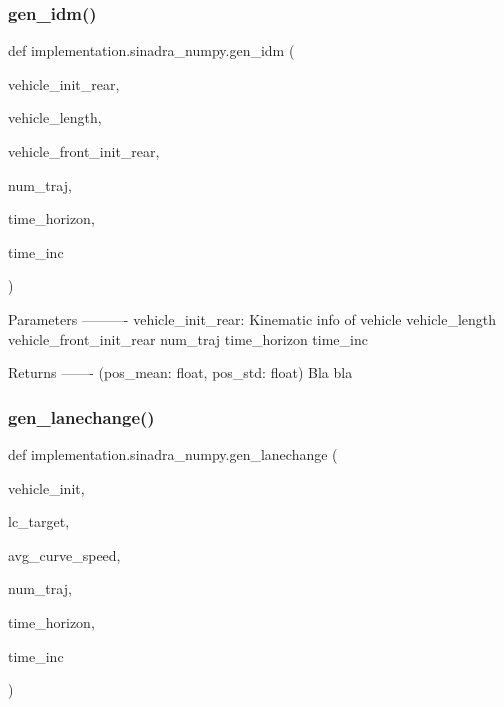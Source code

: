 \subsubsection{\texorpdfstring{gen\+\_\+idm()}{gen\_idm()}}
{\footnotesize\ttfamily def implementation.\+sinadra\+\_\+numpy.\+gen\+\_\+idm (\begin{DoxyParamCaption}\item[{}]{vehicle\+\_\+init\+\_\+rear,  }\item[{}]{vehicle\+\_\+length,  }\item[{}]{vehicle\+\_\+front\+\_\+init\+\_\+rear,  }\item[{}]{num\+\_\+traj,  }\item[{}]{time\+\_\+horizon,  }\item[{}]{time\+\_\+inc }\end{DoxyParamCaption})}

\begin{DoxyVerb}Parameters
----------
vehicle_init_rear: Kinematic info of vehicle
vehicle_length
vehicle_front_init_rear
num_traj
time_horizon
time_inc

Returns
-------
(pos_mean: float, pos_std: float)
Bla bla\end{DoxyVerb}
 \mbox{\label{namespaceimplementation_1_1sinadra__numpy_a4b7cbd2d26084cd3277008980f653f56}} 
\subsubsection{\texorpdfstring{gen\+\_\+lanechange()}{gen\_lanechange()}}
{\footnotesize\ttfamily def implementation.\+sinadra\+\_\+numpy.\+gen\+\_\+lanechange (\begin{DoxyParamCaption}\item[{}]{vehicle\+\_\+init,  }\item[{}]{lc\+\_\+target,  }\item[{}]{avg\+\_\+curve\+\_\+speed,  }\item[{}]{num\+\_\+traj,  }\item[{}]{time\+\_\+horizon,  }\item[{}]{time\+\_\+inc }\end{DoxyParamCaption})}

